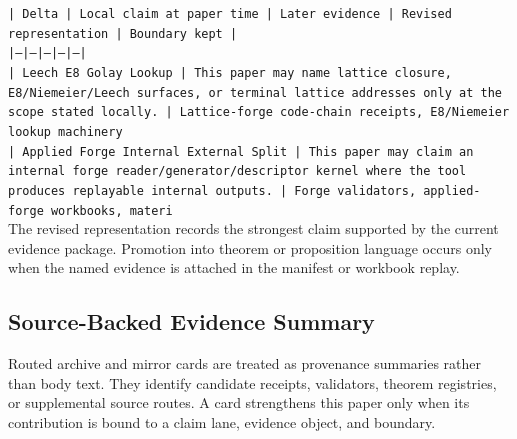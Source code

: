 \documentclass[11pt]{article}
\begin{document}
\noindent\texttt{| Delta | Local claim at paper time | Later evidence | Revised representation | Boundary kept |}\\
\noindent\texttt{|---|---|---|---|---|}\\
\noindent\texttt{| Leech E8 Golay Lookup | This paper may name lattice closure, E8/Niemeier/Leech surfaces, or terminal lattice addresses only at the scope stated locally. | Lattice-forge code-chain receipts, E8/Niemeier lookup machinery}\\
\noindent\texttt{| Applied Forge Internal External Split | This paper may claim an internal forge reader/generator/descriptor kernel where the tool produces replayable internal outputs. | Forge validators, applied-forge workbooks, materi}\\

The revised representation records the strongest claim supported by the current evidence package. Promotion into theorem or proposition language occurs only when the named evidence is attached in the manifest or workbook replay.

\subsection*{Source-Backed Evidence Summary}

Routed archive and mirror cards are treated as provenance summaries rather than
body text. They identify candidate receipts, validators, theorem registries, or
supplemental source routes. A card strengthens this paper only when its
contribution is bound to a claim lane, evidence object, and boundary.
\end{document}
